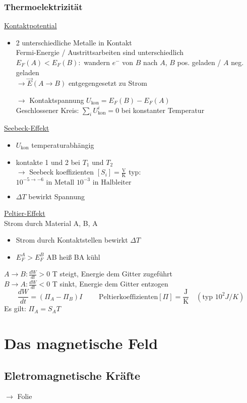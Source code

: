 \documentclass[titlepage,12pt,a4paper,ngerman]{report}
\newcommand{\tx}[1]{\textrm{#1}}
\begin{document}
\subsubsection{Thermoelektrizität}
\underline{Kontaktpotential}
\begin{itemize}
	\item 2 unterschiedliche Metalle in Kontakt\\
	Fermi-Energie / Austrittsarbeiten sind unterschiedlich\\
	$ E_F(A) < E_F(B) : $ wandern $ e^- $ von $ B $ nach $ A $, $ B $ pos. geladen / $ A $ neg. geladen \\
	$ \rightarrow \vec{E}(A\rightarrow B) $ entgegengesetzt zu Strom
	\item[$ \rightarrow $] Kontaktspannung $ U_{\tx{kon}} = E_F(B)-E_F(A) $\\
	Geschlossener Kreis: $ \sum_i U_{\tx{kon}}^i = 0 $ bei konstanter Temperatur
\end{itemize}
\underline{Seebeck-Effekt}
\begin{itemize}
	\item $ U_{\tx{kon}} $ temperaturabhängig
	\item kontakte 1 und 2 bei $ T_1 $ und $ T_2 $\\
	$ \rightarrow $ Seebeck koeffizienten $ [S_i]  = \frac{\tx{V}}{\tx{K}}$ typ: $ 10^{-5 \rightarrow -6} \tx{ in Metall } 10^{-3} \tx{ in Halbleiter } $
	\item $ \Delta T $ bewirkt Spannung
\end{itemize}
\underline{Peltier-Effekt}\\
Strom durch Material A, B, A
\begin{itemize}
	\item Strom durch Kontaktstellen bewirkt $ \Delta T $
	\item $ E^A_F > E_F^B $ AB heiß BA kühl
\end{itemize}
$ A\rightarrow B : \frac{dW}{dt} > 0$ T steigt, Energie dem Gitter zugeführt\\
$ B\rightarrow A : \frac{dW}{dt} < 0$ T sinkt, Energie dem Gitter entzogen
$$\frac{dW}{dt} = (\Pi_A - \Pi_B)I \qquad  \tx{ Peltierkoeffizienten} [\Pi] = \frac{\tx{J}}{\tx{K}} \quad (\tx{typ } 10^2 J/K)$$
Es gilt: $ \Pi_A = S_A T$
\section{Das magnetische Feld}
\subsection{Eletromagnetische Kräfte}
 $ \rightarrow $ Folie
\end{document}
